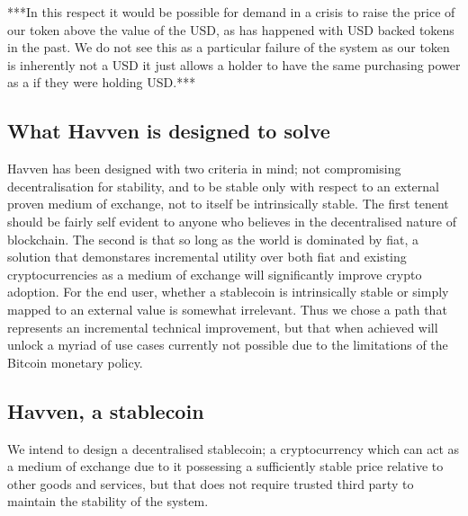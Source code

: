 \documentclass{article}
\begin{document}
***In this respect it would be possible for demand in a crisis to raise the price of our token above the value of the USD, as has happened with USD backed tokens in the past. We do not see this as a particular failure of the system as our token is inherently not a USD it just allows a holder to have the same purchasing power as a if they were holding USD.***

\subsection{What Havven is designed to solve}

\noindent Havven has been designed with two criteria in mind; not compromising decentralisation for stability, and to be stable only with respect to an external proven medium of exchange, not to itself be intrinsically stable. The first tenent should be fairly self evident to anyone who believes in the decentralised nature of blockchain. The second is that so long as the world is dominated by fiat, a solution that demonstares incremental utility over both fiat and existing cryptocurrencies as a medium of exchange will significantly improve crypto adoption. For the end user, whether a stablecoin is intrinsically stable or simply mapped to an external value is somewhat irrelevant. Thus we chose a path that represents an incremental technical improvement, but that when achieved will unlock a myriad of use cases currently not possible due to the limitations of the Bitcoin monetary policy. \\

\subsection{Havven, a stablecoin}

\noindent We intend to design a decentralised stablecoin; a cryptocurrency which can act as a medium of exchange due to it possessing a sufficiently stable price relative to other goods and services, but that does not require trusted third party to maintain the stability of the system.\\
\end{document}
